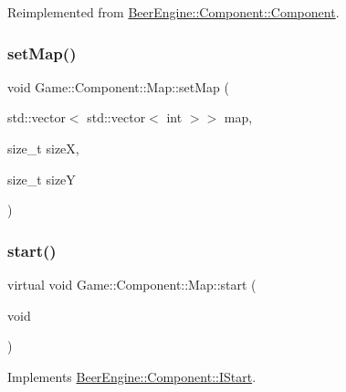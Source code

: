 Reimplemented from \mbox{\hyperlink{class_beer_engine_1_1_component_1_1_component_a4d82d8a6b22b93514e0585fa4073041f}{Beer\+Engine\+::\+Component\+::\+Component}}.

\mbox{\label{class_game_1_1_component_1_1_map_aaa3da00869732537ac17430774fd8357}} 
\subsubsection{\texorpdfstring{set\+Map()}{setMap()}}
{\footnotesize\ttfamily void Game\+::\+Component\+::\+Map\+::set\+Map (\begin{DoxyParamCaption}\item[{std\+::vector$<$ std\+::vector$<$ int $>$$>$}]{map,  }\item[{size\+\_\+t}]{sizeX,  }\item[{size\+\_\+t}]{sizeY }\end{DoxyParamCaption})}

\mbox{\label{class_game_1_1_component_1_1_map_a76e2153b5f69646ba7cf77b6cd0f5096}} 
\subsubsection{\texorpdfstring{start()}{start()}}
{\footnotesize\ttfamily virtual void Game\+::\+Component\+::\+Map\+::start (\begin{DoxyParamCaption}\item[{void}]{ }\end{DoxyParamCaption})\hspace{0.3cm}{\ttfamily [virtual]}}



Implements \mbox{\hyperlink{class_beer_engine_1_1_component_1_1_i_start_aa3e25e86e20c46cdaefc6f6d7f21e495}{Beer\+Engine\+::\+Component\+::\+I\+Start}}.

\mbox{\label{class_game_1_1_component_1_1_map_a0d11f1fd95d17f380ffdc65e7ef9dec9}} 

